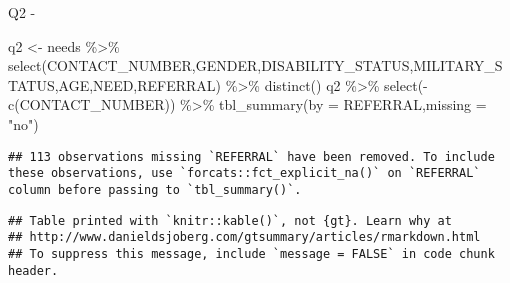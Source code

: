 \documentclass[
]{article}
\newenvironment{Shaded}{\begin{snugshade}}{\end{snugshade}}
\newcommand{\AttributeTok}[1]{\textcolor[rgb]{0.77,0.63,0.00}{#1}}
\newcommand{\FunctionTok}[1]{\textcolor[rgb]{0.00,0.00,0.00}{#1}}
\newcommand{\NormalTok}[1]{#1}
\newcommand{\OtherTok}[1]{\textcolor[rgb]{0.56,0.35,0.01}{#1}}
\newcommand{\SpecialCharTok}[1]{\textcolor[rgb]{0.00,0.00,0.00}{#1}}
\newcommand{\StringTok}[1]{\textcolor[rgb]{0.31,0.60,0.02}{#1}}
\begin{document}
Q2 -

\begin{Shaded}
\begin{Highlighting}[]
\NormalTok{q2 }\OtherTok{\textless{}{-}}\NormalTok{ needs }\SpecialCharTok{\%\textgreater{}\%} \FunctionTok{select}\NormalTok{(CONTACT\_NUMBER,GENDER,DISABILITY\_STATUS,MILITARY\_STATUS,AGE,NEED,REFERRAL) }\SpecialCharTok{\%\textgreater{}\%} \FunctionTok{distinct}\NormalTok{()}
\NormalTok{q2 }\SpecialCharTok{\%\textgreater{}\%} \FunctionTok{select}\NormalTok{(}\SpecialCharTok{{-}}\FunctionTok{c}\NormalTok{(CONTACT\_NUMBER)) }\SpecialCharTok{\%\textgreater{}\%} \FunctionTok{tbl\_summary}\NormalTok{(}\AttributeTok{by =}\NormalTok{ REFERRAL,}\AttributeTok{missing =} \StringTok{"no"}\NormalTok{)}
\end{Highlighting}
\end{Shaded}

\begin{verbatim}
## 113 observations missing `REFERRAL` have been removed. To include these observations, use `forcats::fct_explicit_na()` on `REFERRAL` column before passing to `tbl_summary()`.
\end{verbatim}

\begin{verbatim}
## Table printed with `knitr::kable()`, not {gt}. Learn why at
## http://www.danieldsjoberg.com/gtsummary/articles/rmarkdown.html
## To suppress this message, include `message = FALSE` in code chunk header.
\end{verbatim}
\end{document}

